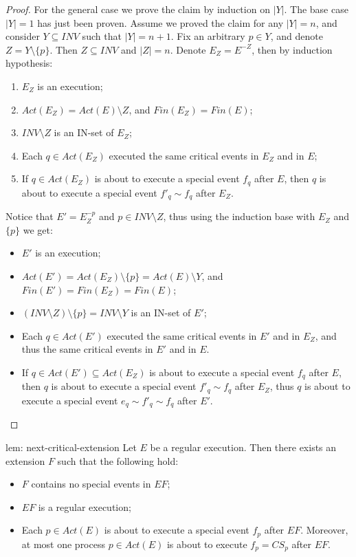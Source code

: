 \begin{proof}
	For the general case we prove the claim by induction on $|Y|$. The base case $|Y| = 1$ has just been proven. Assume we proved the claim for any $|Y|=n$, and consider $Y \subseteq INV$ such that $|Y| = n+1$. Fix an arbitrary $p \in Y$, and denote $Z = Y \setminus \{p\}$. Then $Z \subseteq INV$ and $|Z|=n$. Denote $E_Z = E^{-Z}$, then by induction hypothesis:
	\begin{enumerate}
		\item $E_Z$ is an execution;
		\item $Act(E_Z) = Act(E) \setminus Z$, and $Fin(E_Z) = Fin(E)$;
		\item $INV \setminus Z$ is an IN-set of $E_Z$;
		\item Each $q \in Act(E_Z)$ executed the same critical events in $E_Z$ and in $E$;
		\item If $q \in Act(E_Z)$ is about to execute a special event $f_q$ after $E$, then $q$ is about to execute a special event $f'_q \sim f_q$ after $E_Z$.
	\end{enumerate}
	Notice that $E' = E_Z^{-p}$ and $p \in INV \setminus Z$, thus using the induction base with $E_Z$ and $\{p\}$ we get:
	\begin{itemize}
		\item $E'$ is an execution;
		\item $Act(E') = Act(E_Z) \setminus \{p\} = Act(E) \setminus Y$, and $Fin(E') = Fin(E_Z) = Fin(E)$;
		\item $(INV \setminus Z) \setminus \{p\} = INV \setminus Y$ is an IN-set of $E'$;
		\item Each $q \in Act(E')$ executed the same critical events in $E'$ and in $E_Z$, and thus the same critical events in $E'$ and in $E$.
		\item If $q \in Act(E') \subseteq Act(E_Z)$ is about to execute a special event $f_q$ after $E$, then $q$ is about to execute a special event $f'_q \sim f_q$ after $E_Z$, thus $q$ is about to execute a special event $e_q \sim f'_q \sim f_q$ after $E'$.
	\end{itemize}
\end{proof}


\begin{lemma-repeat} {lem: next-critical-extension}
	Let $E$ be a regular execution. Then there exists an extension $F$ such that the following hold:
	\begin{itemize}
		\item $F$ contains no special events in $E F$;
		\item $E F$ is a regular execution;
		\item Each $p \in Act(E)$ is about to execute a special event $f_p$ after $E F$. Moreover, at most one process $p \in Act(E)$ is about to execute $f_p=CS_p$ after $E F$.
	\end{itemize}
\end{lemma-repeat}

